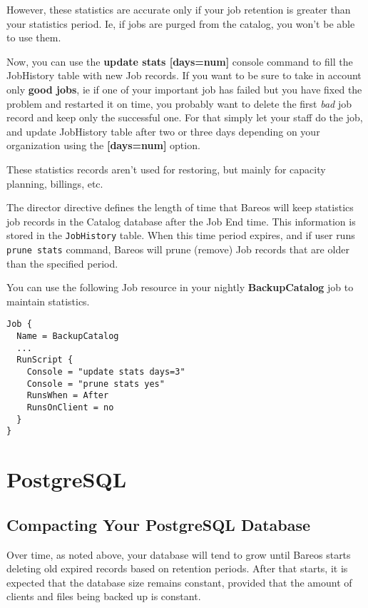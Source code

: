 However, these statistics are accurate only if your job retention is greater
than your statistics period. Ie, if jobs are purged from the catalog, you won't
be able to use them.

Now, you can use the \textbf{update stats [days=num]} console command to fill
the JobHistory table with new Job records. If you want to be sure to take in
account only \textbf{good jobs}, ie if one of your important job has failed but
you have fixed the problem and restarted it on time, you probably want to
delete the first \textit{bad} job record and keep only the successful one. For
that simply let your staff do the job, and update JobHistory table after two or
three days depending on your organization using the \textbf{[days=num]} option.

These statistics records aren't used for restoring, but mainly for
capacity planning, billings, etc.

The  director directive defines
the length of time that Bareos will keep statistics job records in the Catalog
database after the Job End time. This information is stored in the \texttt{JobHistory} table.
When this time
period expires, and if user runs \texttt{prune stats} command, Bareos will
prune (remove) Job records that are older than the specified period.

You can use the following Job resource in your nightly \textbf{BackupCatalog}
job to maintain statistics.
\begin{verbatim}
Job {
  Name = BackupCatalog
  ...
  RunScript {
    Console = "update stats days=3"
    Console = "prune stats yes"
    RunsWhen = After
    RunsOnClient = no
  }
}
\end{verbatim}


\section{PostgreSQL}

\subsection{Compacting Your PostgreSQL Database}
\label{CompactingPostgres}

Over time, as noted above, your database will tend to grow until Bareos starts
deleting old expired records based on retention periods. After that starts,
it is expected that the database size remains constant, provided that the amount
of clients and files being backed up is constant.

